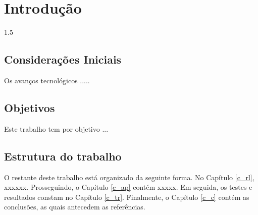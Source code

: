 \documentclass[a4paper,12pt,openright,oneside]{book}
\newenvironment{myenv}[1]
  {\begin{spacing}{#1}}
  {\end{spacing}}
\begin{document}
\chapter{Introdu\c c\~ao}
\begin{myenv}{1.5}
\setcounter{page}{12}
\section{Considera\c{c}\~{o}es Iniciais}
Os avan\c cos tecnol\'ogicos  .....
\section{Objetivos}
Este trabalho tem por objetivo ...
\section{Estrutura do trabalho}
O restante deste trabalho est\'{a} organizado da seguinte forma. No Cap\'itulo \ref{c_rl}, xxxxxx. Prosseguindo, o Cap\'itulo \ref{c_ap} cont\'{e}m xxxxx. Em seguida, os testes e resultados constam no Cap\'itulo \ref{c_tr}. Finalmente, o Cap\'itulo \ref{c_c} cont\'{e}m as conclus\~oes, as quais  antecedem as refer\^{e}ncias.
\end{myenv}
\end{document}
